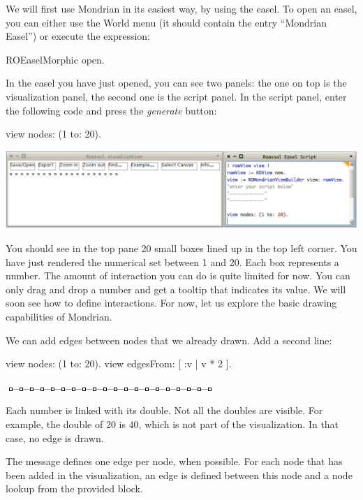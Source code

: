 \documentclass[a4paper,10pt,twoside]{book}
\begin{document}
We will first use Mondrian in its easiest way, by using the easel. To open an easel, you can either use the World menu (it should contain the entry ``Mondrian Easel'') or execute the expression:

\begin{code}{}
ROEaselMorphic open.
\end{code}


In the easel you have just opened, you can see two panels: the one on top is the visualization panel, the second one is the script panel. In the script panel, enter the following code and press the \emph{generate} button:

\begin{code}{}
view nodes: (1 to: 20).
\end{code}
\begin{center}\includegraphics[scale=0.34]{picture1}\end{center}

You should see in the top pane 20 small boxes lined up in the top left corner. You have just rendered the numerical set between 1 and 20. Each box represents a number. The amount of interaction you can do is quite limited for now. You can only drag and drop a number and get a tooltip that indicates its value. We will soon see how to define interactions. For now, let us explore the basic drawing capabilities of Mondrian.

We can add edges between nodes that we already drawn. Add a second line:

\begin{code}{}
view nodes: (1 to: 20).
view edgesFrom: [ :v | v * 2 ].
\end{code}
\begin{center}\includegraphics[scale=0.4]{picture2}\end{center}

Each number is linked with its double. Not all the doubles are visible. For example, the double of 20 is 40, which is not part of the visualization. In that case, no edge is drawn. 

The message  defines one edge per node, when possible. For each node that has been added in the visualization, an edge is defined between this node and a node lookup from the provided block.
\end{document}
